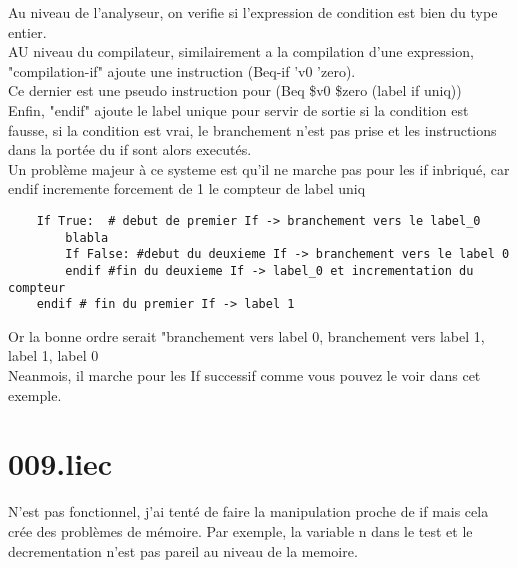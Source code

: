 \documentclass[12pt, letterpaper]{article}
\begin{document}
Au niveau de l'analyseur, on verifie si l'expression de condition est bien du type entier.\\
AU niveau du compilateur, similairement a la compilation d'une expression, "compilation-if" ajoute une instruction (Beq-if 'v0 'zero).\\
Ce dernier est une pseudo instruction pour (Beq \$v0 \$zero (label if uniq))\\
Enfin, "endif" ajoute le label unique pour servir de sortie si la condition est fausse, si la condition est vrai, le branchement n'est pas prise et les instructions dans la portée du if sont alors executés.\\

Un problème majeur à ce systeme est qu'il ne marche pas pour les if inbriqué, car endif incremente forcement de 1 le compteur de label uniq\\
\begin{lstlisting}
    If True:  # debut de premier If -> branchement vers le label_0
        blabla
        If False: #debut du deuxieme If -> branchement vers le label 0
        endif #fin du deuxieme If -> label_0 et incrementation du compteur
    endif # fin du premier If -> label 1 
\end{lstlisting}
Or la bonne ordre serait "branchement vers label 0, branchement vers label 1, label 1, label 0\\
Neanmois, il marche pour les If successif comme vous pouvez le voir dans cet exemple.\\
\section{009.liec}
N'est pas fonctionnel, j'ai tenté de faire la manipulation proche de if mais cela crée des problèmes de mémoire. 
Par exemple, la variable n dans le test et le decrementation n'est pas pareil au niveau de la memoire.
\end{document}
